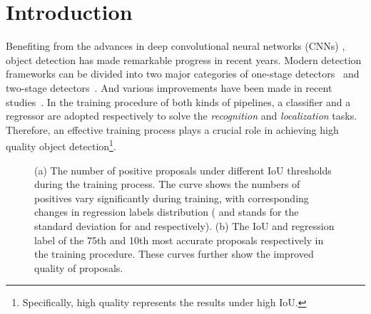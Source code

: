 \documentclass[runningheads]{llncs}
\begin{document}
\section{Introduction}

Benefiting from the advances in deep convolutional neural networks (CNNs) \cite{AlexNet,VGG,ResNet,AP3D}, object detection has made remarkable progress in recent years. Modern detection frameworks can be divided into two major categories of one-stage detectors~\cite{YOLO,SSD,FocalLoss} and two-stage detectors~\cite{RCNN,FastRCNN,FasterRCNN}. And various improvements have been made in recent studies~\cite{FCOS,TridentNet,RepPoints,CascadeRetinaNet,NoisyAnchors,CornerNet,RFBNet,AlignDet,LSTS}.
In the training procedure of both kinds of pipelines, a classifier and a regressor are adopted respectively to solve the \textit{recognition} and \textit{localization} tasks. Therefore, an effective training process plays a crucial role in achieving high quality object detection\footnote[1]{Specifically, high quality represents the results under high IoU.}.


\begin{figure}[!t]
    \centering
    \caption{(a) The number of positive proposals under different IoU thresholds during the training process. The curve shows the numbers of positives vary significantly during training, with corresponding changes in regression labels distribution ( and  stands for the standard deviation for  and  respectively). (b) The IoU and regression label of the 75th and 10th most accurate proposals respectively in the training procedure. These curves further show the improved quality of proposals.
    }
    \label{fig:quantity}
\end{figure}
\end{document}
